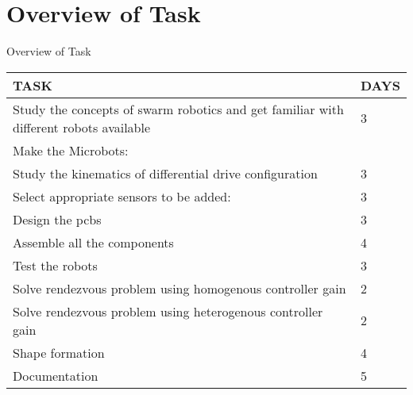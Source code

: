 \documentclass[10pt, a4paper]{beamer}
\begin{document}
\section{Overview of Task}
\begin{frame}{Overview of Task}
	\begin{center}
		\begin{tabular}{|p{8cm}|p{1cm}|} 
			\hline
			\textbf{TASK} & \textbf{DAYS} \\ 
			\hline
			Study the concepts of swarm robotics and get familiar with different robots available & 3 \\ 
			\hline
			Make the Microbots: & \\ 
			\hline
			Study the kinematics of differential drive configuration & 3 \\ 
			\hline
			Select appropriate sensors to be added: & 3 \\ 
			\hline
			Design the pcbs & 3 \\ 
			\hline
			Assemble all the components & 4 \\ 
			\hline
			Test the robots & 3 \\ 
			\hline
			Solve rendezvous problem using homogenous controller gain & 2 \\ 
			\hline
			Solve rendezvous problem using heterogenous controller gain & 2 \\ 
			\hline
			Shape formation & 4 \\ 
			\hline
			Documentation & 5 \\ 
			\hline		
		\end{tabular}
	\end{center}
\end{frame}
\end{document}
